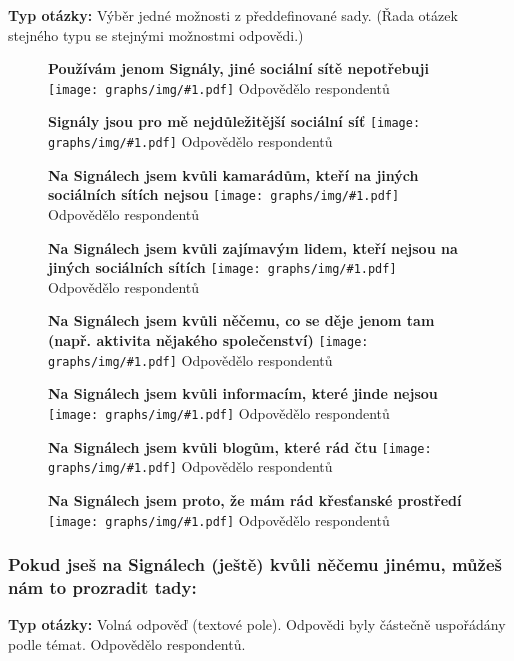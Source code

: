 \documentclass[12pt, a4paper, twoside]{article}
\newcommand{\answercount}[1]{Odpovědělo  respondentů}
\newcommand{\includegraph}[2]{
  \begin{figure}[H]
    \centering
    \textbf{#2}
    \texttt{[image: graphs/img/\#1.pdf]}
    \answercount{#1}
  \end{figure}
}
\newcommand{\qtype}{\textbf{Typ otázky:}
}
\newcommand{\pickOne}{Výběr jedné možnosti z předdefinované sady\xspace}
\newcommand{\series}{(Řada otázek stejného typu se stejnými možnostmi odpovědi.)\xspace}
\newcommand{\freeEntry}{Volná odpověď (textové pole)}
\begin{document}
\qtype \pickOne. \series

\includegraph{proc_signaly_jenom_signaly}{Používám jenom Signály, jiné sociální sítě nepotřebuji}

\includegraph{proc_signaly_signaly_nejdulezitejsi}{Signály jsou pro mě nejdůležitější sociální síť}

\includegraph{proc_signaly_kamaradi_kteri_jinde_nejsou}{Na Signálech jsem kvůli kamarádům, kteří na jiných sociálních sítích nejsou}

\includegraph{proc_signaly_zajimavi_lide_kteri_jinde_nejsou}{Na Signálech jsem kvůli zajímavým lidem, kteří nejsou na jiných sociálních sítích}

\includegraph{proc_signaly_jedinecna_aktivita}{Na Signálech jsem kvůli něčemu, co se děje jenom tam (např. aktivita nějakého společenství)}

\includegraph{proc_signaly_jedinecne_informace}{Na Signálech jsem kvůli informacím, které jinde nejsou}

\includegraph{proc_signaly_oblibene_blogy}{Na Signálech jsem kvůli blogům, které rád čtu}

\includegraph{proc_signaly_krestanske_prostredi}{Na Signálech jsem proto, že mám rád křesťanské prostředí}

\subsubsection{Pokud jseš na Signálech (ještě) kvůli něčemu jinému, můžeš nám to prozradit tady:}

\qtype \freeEntry.
Odpovědi byly částečně uspořádány podle témat.
\answercount{proc_signaly_jine}.
\end{document}
